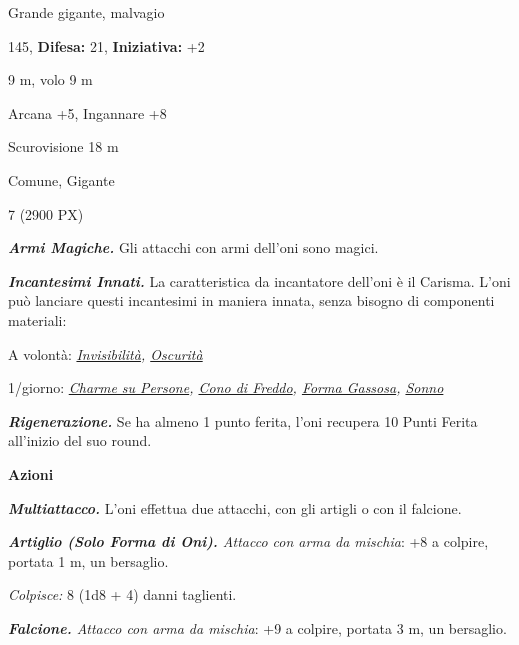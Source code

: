 \begin{multicols}{2}
{
\noindent
\begin{description}[noitemsep, topsep=0pt, parsep=0pt, partopsep=0pt, leftmargin=0cm, labelwidth=2.2cm]
	\item[\textbf{Taglia/Tipo:}] Grande gigante, malvagio
	\item[\textbf{Caratt.:}] 
	\item[\textbf{Punti Ferita:}] 145,  \textbf{Difesa:} 21,  \textbf{Iniziativa:} +2
	\item[\textbf{Movimento:}] 9 m, volo 9 m
	\item[\textbf{Tiri Salvez.:}] 
	\item[\textbf{Comp.:}] Arcana +5, Ingannare +8
	\item[\textbf{Sensi:}] Scurovisione 18 m
	\item[\textbf{Linguaggi:}] Comune, Gigante
	\item[\textbf{Sfida:}] 7 (2900 PX)\smallskip
\end{description}

\emph{\textbf{Armi Magiche.}} Gli attacchi con armi dell'oni sono magici.

\emph{\textbf{Incantesimi Innati.}} La caratteristica da incantatore dell'oni è il Carisma. L'oni può lanciare questi incantesimi in maniera innata, senza bisogno di componenti materiali:

A volontà: \emph{\hyperlink{Invisibilità}{Invisibilità}, \hyperlink{Oscurità}{Oscurità}}

1/giorno: \emph{\hyperlink{Charme su Persone}{Charme su Persone}, \hyperlink{Cono di Freddo}{Cono di Freddo}, \hyperlink{Forma Gassosa}{Forma Gassosa}, \hyperlink{Sonno}{Sonno}}

\emph{\textbf{Rigenerazione.}} Se ha almeno 1 punto ferita, l'oni recupera 10 Punti Ferita all'inizio del suo round.

\textbf{Azioni}

\emph{\textbf{Multiattacco.}} L'oni effettua due attacchi, con gli artigli o con il falcione.

\emph{\textbf{Artiglio (Solo Forma di Oni).} Attacco con arma da mischia}: +8 a colpire, portata 1 m, un bersaglio.

\emph{Colpisce:} 8 (1d8 + 4) danni taglienti.

\emph{\textbf{Falcione.} Attacco con arma da mischia}: +9 a colpire, portata 3 m, un bersaglio.

}
\end{multicols}
